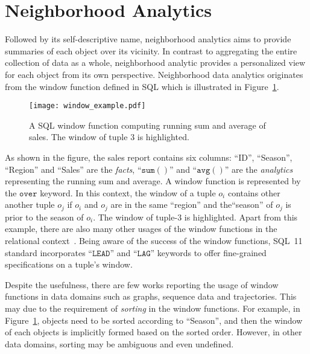 \section{Neighborhood Analytics}
Followed by its self-descriptive name, neighborhood analytics aims to provide
summaries of each object over its vicinity. In contrast to aggregating the entire collection of data as a whole, neighborhood
analytic provides a personalized view for each object from its own perspective. Neighborhood
data analytics originates from the window function defined in SQL which is
illustrated in Figure~\ref{fig:window}.

\begin{figure}[h]
\centering
\texttt{[image: window\_example.pdf]}
\caption{A SQL window function computing running sum and average of
sales. The window of tuple 3 is highlighted.} 
\label{fig:window}
\end{figure}

As shown in the figure, the sales report contains six columns: ``ID'',
``Season'', ``Region'' and ``Sales'' are the \emph{facts}, ``$\mathtt{sum()}$'' and ``$\mathtt{avg()}$''
are the \emph{analytics} representing the running sum and average. A window function
is represented by the $\mathtt{over}$ keyword. In this context, the window of a tuple $o_i$
contains other another tuple $o_j$ if $o_i$ and $o_j$ are in the same ``region'' and the``season'' of $o_j$ is
prior to the season of $o_i$. The window of tuple-$3$ is highlighted.
Apart from this example, there are also many other 
usages of the window functions in the relational context~\cite{cao2012optimization}. 
Being aware of the success of the window functions, 
SQL~11~\cite{zemke2012s} standard incorporates ``$\mathtt{LEAD}$'' and ``$\mathtt{LAG}$'' 
keywords to offer fine-grained specifications on a tuple's window.

Despite the usefulness, there are few works reporting
the usage of window functions in data domains such as graphs, sequence data and trajectories.
This may due to the
requirement of \emph{sorting} in the window functions. For example,
in Figure~\ref{fig:window},
objects need to be sorted according to ``Season'', and then the window of
each objects is implicitly formed based on the sorted order. However, 
in other data domains, sorting may be ambiguous and even undefined.

